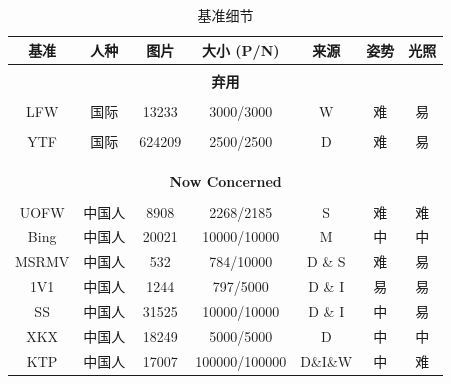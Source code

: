 \documentclass[a4paper, 11pt, UTF8]{ctexart}%
\begin{document}
\begin{table}[h]
\caption{基准细节}
\label{sample-table}
\begin{center}
\begin{tabular}{ccccccc}
\multicolumn{1}{c}{\bf 基准}  &\multicolumn{1}{c}{\bf 人种} &\multicolumn{1}{c}{\bf 图片} &\multicolumn{1}{c}{\bf 大小 (P/N)} &\multicolumn{1}{c}{\bf 来源} &\multicolumn{1}{c}{\bf 姿势}&\multicolumn{1}{c}{\bf 光照}
\\ \hline \\
\multicolumn{7}{c}{\bf 弃用}\\
\\
LFW         &国际  &13233  &3000/3000  &W  &难 &易  \\ \\ %
YTF   &国际  &624209  &2500/2500  &D  &难 &易  \\ \\ \\ \hline \\
\multicolumn{7}{c}{\bf Now Concerned}\\
\\
UOFW         &中国人  &8908  &2268/2185  &S&难 &难   \\ %
Bing    &中国人  &20021  &10000/10000  &M  &中 &中   \\ %
MSRMV   &中国人  &532  &784/10000  &D \& S  &难 &易   \\ %
1V1         &中国人  &1244  &797/5000  &D \& I  &易 &易 \\ %
SS         &中国人  &31525  &10000/10000  &D \& I  &中  &易 \\
XKX         &中国人  &18249  &5000/5000  &D  &中  &中 \\
KTP         &中国人  &17007  &100000/100000  &D\&I\&W  &中  &难 \\
\end{tabular}
\end{center}
\end{table}
\end{document}
